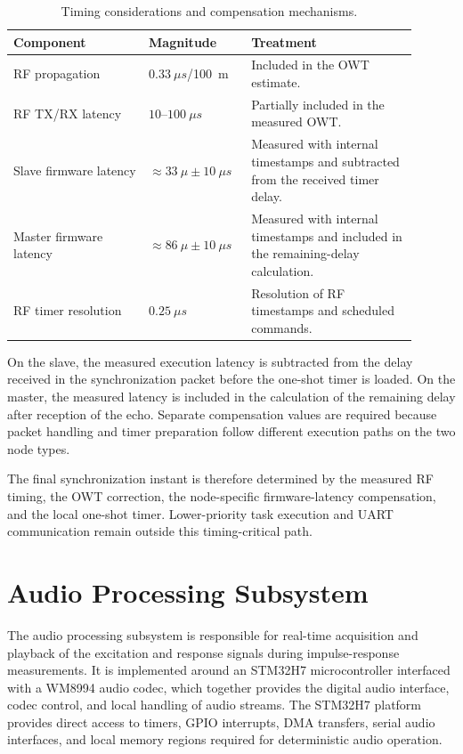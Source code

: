 \begin{table}[!h]
    \centering
    \caption{Timing considerations and compensation mechanisms.}
    \label{tab:sync_timing_components}
    \begin{tabular}{|p{0.31\linewidth}|p{0.21\linewidth}|p{0.38\linewidth}|}
        \hline
        \textbf{Component} & \textbf{Magnitude} & \textbf{Treatment} \\
        \hline
        RF propagation &
        $0.33~\mu s$/100~m &
        Included in the OWT estimate. \\
        \hline
        RF TX/RX latency &
        $10$--$100~\mu s$ &
        Partially included in the measured OWT. \\
        \hline
        Slave firmware latency &
        $\approx 33~\mu \pm 10~\mu s$ &
        Measured with internal timestamps and subtracted from the received timer delay. \\
        \hline
        Master firmware latency &
        $\approx 86~\mu \pm 10~\mu s$ &
        Measured with internal timestamps and included in the remaining-delay calculation. \\
        \hline
        RF timer resolution &
        $0.25~\mu s$ &
        Resolution of RF timestamps and scheduled commands. \\
        \hline
    \end{tabular}
\end{table}

On the slave, the measured execution latency is subtracted from the delay received in the synchronization packet before the one-shot timer is loaded. On the master, the measured latency is included in the calculation of the remaining delay after reception of the echo. Separate compensation values are required because packet handling and timer preparation follow different execution paths on the two node types.

The final synchronization instant is therefore determined by the measured RF timing, the OWT correction, the node-specific firmware-latency compensation, and the local one-shot timer. Lower-priority task execution and UART communication remain outside this timing-critical path.

\section{Audio Processing Subsystem}
\label{sec:audio_subsystem}
The audio processing subsystem is responsible for real-time acquisition and playback of the excitation and response signals during impulse-response measurements. It is implemented around an STM32H7 microcontroller interfaced with a WM8994 audio codec, which together provides the digital audio interface, codec control, and local handling of audio streams. The STM32H7 platform provides direct access to timers, GPIO interrupts, DMA transfers, serial audio interfaces, and local memory regions required for deterministic audio operation.

